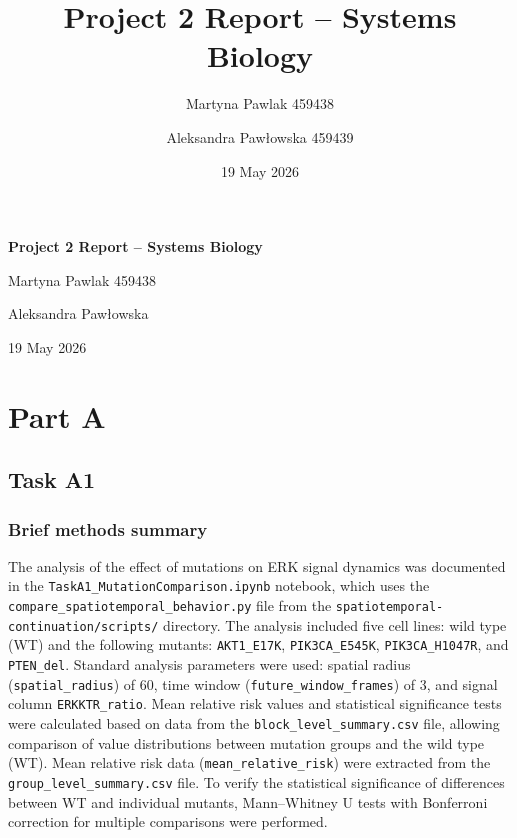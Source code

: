 \documentclass{article}
\title{Project 2 Report -- Systems Biology}
\author{
    Martyna Pawlak 459438\\
    \and
    Aleksandra Pawłowska 459439
}
\date{19 May 2026}
\begin{document}
\begin{titlepage}
    \centering
    \vspace*{4cm}

    {\Huge \textbf{Project 2 Report -- Systems Biology} \par}

    \vspace{2cm}

    {\Large
    Martyna Pawlak 459438\par
    \vspace{0.5cm}
    Aleksandra Pawłowska\par
    }

    \vfill

    {\large 19 May 2026 \par}
\end{titlepage}

\section{Part A}

\subsection{Task A1}

\subsubsection{Brief methods summary}
The analysis of the effect of mutations on ERK signal dynamics was documented in
the \texttt{TaskA1\_MutationComparison.ipynb} notebook, which uses the
\texttt{compare\_spatiotemporal\_behavior.py} file from the
\texttt{spatiotemporal-continuation/scripts/} directory.
The analysis included five cell lines: wild type (WT) and the following mutants:
\texttt{AKT1\_E17K}, \texttt{PIK3CA\_E545K}, \texttt{PIK3CA\_H1047R}, and
\texttt{PTEN\_del}.
Standard analysis parameters were used: spatial radius (\texttt{spatial\_radius})
of 60, time window (\texttt{future\_window\_frames}) of 3, and signal column
\texttt{ERKKTR\_ratio}.
Mean relative risk values and statistical significance tests were calculated based
on data from the \texttt{block\_level\_summary.csv} file, allowing comparison of
value distributions between mutation groups and the wild type (WT).
Mean relative risk data (\texttt{mean\_relative\_risk}) were extracted from the
\texttt{group\_level\_summary.csv} file.
To verify the statistical significance of differences between WT and individual
mutants, Mann--Whitney U tests with Bonferroni correction for multiple comparisons
were performed.
\end{document}
